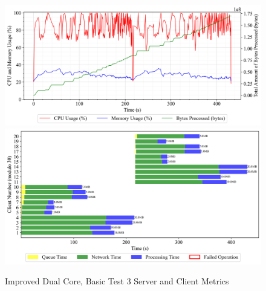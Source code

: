 \newpage
\begin{figure}[h!t]
    \begin{center}
    \label{Fig:A1.19}
    \caption{Improved Dual Core, Basic Test 3 Server and Client Metrics}
    \includegraphics[width=\xLarge\textwidth]{Chapter4/Results/2c_improved_results/arty-a7-2c-improved_basic_3_20241007_122706.db_server_metrics.png}
    \includegraphics[width=\xLarge\textwidth]{Chapter4/Results/2c_improved_results/arty-a7-2c-improved_basic_3_20241007_122706.db_client_tasks.png}
    \end{center}
\end{figure}

